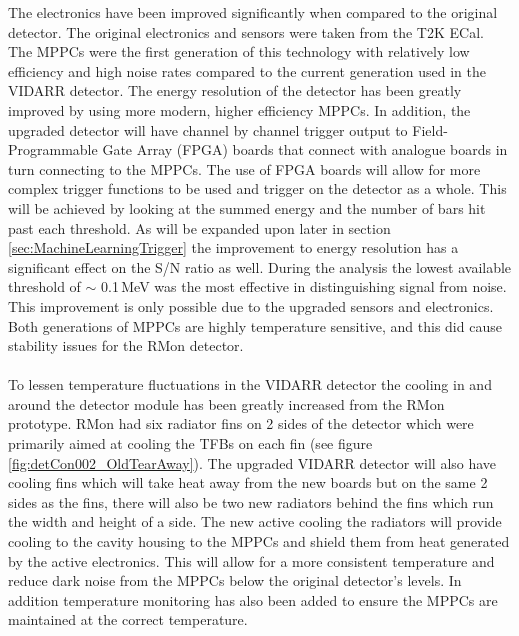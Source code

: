 The electronics have been improved significantly when compared to the original detector. The original electronics and sensors were taken from the T2K ECal. The MPPCs were the first generation of this technology with relatively low efficiency and high noise rates compared to the current generation used in the VIDARR detector. The energy resolution of the detector has been greatly improved by using more modern, higher efficiency MPPCs. In addition, the upgraded detector will have channel by channel trigger output to Field-Programmable Gate Array (FPGA) boards that connect with analogue boards in turn connecting to the MPPCs. The use of FPGA boards will allow for more complex trigger functions to be used and trigger on the detector as a whole. This will be achieved by looking at the summed energy and the number of bars hit past each threshold. As will be expanded upon later in section \ref{sec:MachineLearningTrigger} the improvement to energy resolution has a significant effect on the S/N ratio as well. During the analysis the lowest available threshold of $\sim$ 0.1\,MeV was the most effective in distinguishing signal from noise. This improvement is only possible due to the upgraded sensors and electronics. Both generations of MPPCs are highly temperature sensitive, and this did cause stability issues for the RMon detector. %
\\\\To lessen temperature fluctuations in the VIDARR detector the cooling in and around the detector module has been greatly increased from the RMon prototype. RMon had six radiator fins on 2 sides of the detector which were primarily aimed at cooling the TFBs on each fin (see figure \ref{fig:detCon002_OldTearAway}). The upgraded VIDARR detector will also have cooling fins which will take heat away from the new boards but on the same 2 sides as the fins, there will also be two new radiators behind the fins which run the width and height of a side. The new active cooling the radiators will provide cooling to the cavity housing to the MPPCs and shield them from heat generated by the active electronics. This will allow for a more consistent temperature and reduce dark noise from the MPPCs below the original detector's levels. In addition temperature monitoring has also been added to ensure the MPPCs are maintained at the correct temperature.

